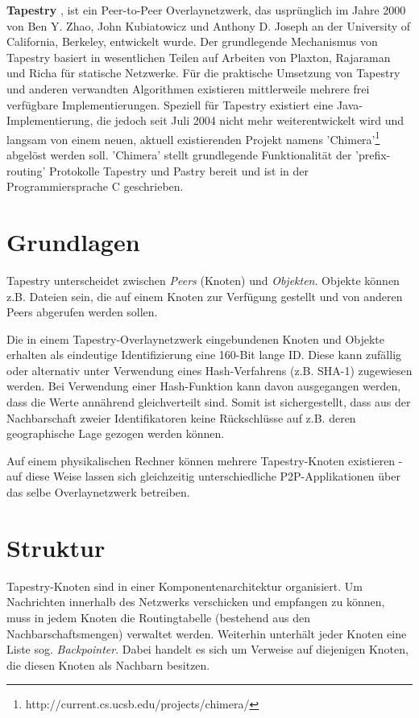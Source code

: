 \textbf{Tapestry} \cite{TapestryTR}, \cite{tapestry_jsac} ist ein Peer-to-Peer 
Overlaynetzwerk, das usprünglich im Jahre 2000 von Ben Y. Zhao, John 
Kubiatowicz und Anthony D. Joseph an der University of California, Berkeley, 
entwickelt wurde. Der grundlegende Mechanismus von Tapestry basiert in 
wesentlichen Teilen auf Arbeiten von Plaxton, Rajaraman und Richa 
\cite{PlaxtonRR97} für statische Netzwerke. Für die praktische Umsetzung von 
Tapestry und anderen verwandten Algorithmen existieren mittlerweile mehrere 
frei verfügbare Implementierungen. Speziell für Tapestry existiert eine 
Java-Implementierung, die jedoch seit Juli 2004 nicht mehr weiterentwickelt wird
und langsam von einem neuen, aktuell existierenden Projekt namens 
'Chimera'\footnote{http://current.cs.ucsb.edu/projects/chimera/} abgelöst 
werden soll. 'Chimera' stellt grundlegende Funktionalität der 'prefix-routing' 
Protokolle Tapestry und Pastry bereit und ist in der Programmiersprache C 
geschrieben.

\section{Grundlagen}
Tapestry unterscheidet zwischen \textsl{Peers} (Knoten) und \textsl{Objekten}.
Objekte können z.B. Dateien sein, die auf einem Knoten zur Verfügung gestellt 
und von anderen Peers abgerufen werden sollen.

Die in einem Tapestry-Overlaynetzwerk eingebundenen Knoten und Objekte erhalten 
als eindeutige Identifizierung eine 160-Bit lange ID. Diese kann zufällig oder 
alternativ unter Verwendung eines Hash-Verfahrens (z.B. SHA-1) zugewiesen 
werden. Bei Verwendung einer Hash-Funktion kann davon ausgegangen werden, dass 
die Werte annährend gleichverteilt sind. Somit ist sichergestellt, dass aus der 
Nachbarschaft zweier Identifikatoren keine Rückschlüsse auf z.B. deren 
geographische Lage gezogen werden können.

Auf einem physikalischen Rechner können mehrere Tapestry-Knoten existieren - 
auf diese Weise lassen sich gleichzeitig unterschiedliche P2P-Applikationen 
über das selbe Overlaynetzwerk betreiben.

\section{Struktur}
Tapestry-Knoten sind in einer Komponentenarchitektur organisiert. Um 
Nachrichten innerhalb des Netzwerks verschicken und empfangen zu können, muss 
in jedem Knoten die Routingtabelle (bestehend aus den Nachbarschaftsmengen) 
verwaltet werden. Weiterhin unterhält jeder Knoten eine Liste sog. 
\textsl{Backpointer}. Dabei handelt es sich um Verweise auf diejenigen Knoten, 
die diesen Knoten als Nachbarn besitzen.


